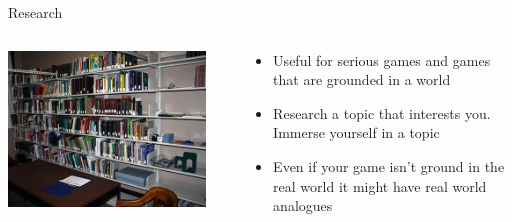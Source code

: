 \begin{frame}{Research}
	\begin{columns}
		\begin{column}{0.48\textwidth}
			\includegraphics[width=0.9\textwidth, height=0.7\textheight]{research}
		\end{column}
		\begin{column}{0.48\textwidth}
			\begin{itemize}
				\item  Useful for serious games and games that are grounded in a world
				\item Research a topic that interests you. Immerse yourself in a topic
				\item Even if your game isn’t ground in the real world it might have real world analogues
				
			\end{itemize}
		\end{column}
	\end{columns}
\end{frame}